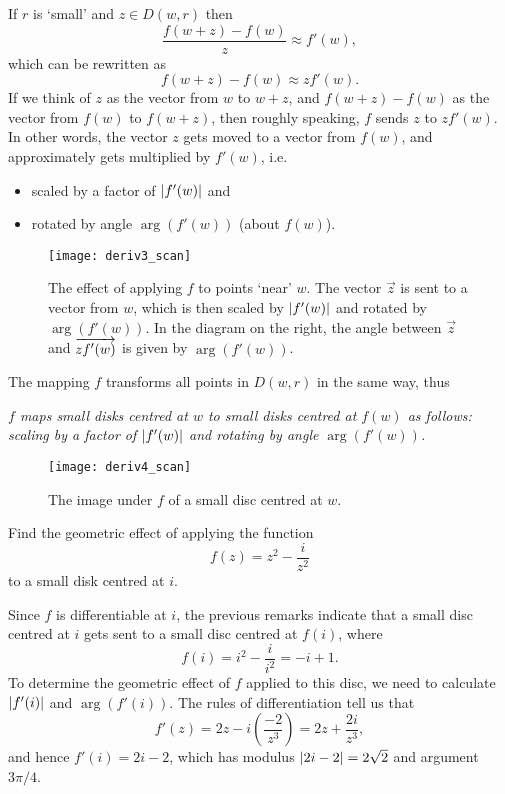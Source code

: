 If $r$ is `small' and $z \in D(w,r)$ then
\[
\frac{f(w+z)-f(w)}{z} \approx f'(w),
\]
which can be rewritten as
\[
f(w+z) - f(w)\approx zf'(w).
\]
If we think of $z$ as the vector from $w$ to $w+z$, and $f(w+z)-f(w)$ as the vector from $f(w)$ to $f(w+z)$, then roughly speaking, $f$  sends $z$ to $zf'(w)$.  In other words, the vector $z$ gets moved to a vector from $f(w)$, and approximately gets multiplied by $f'(w)$, i.e.
\begin{itemize}
\item scaled by a factor of $\left| f'(w) \right|$ and
\item rotated by angle $\arg (f'(w))$ (about $f(w)$).
\end{itemize}
\begin{figure}[h]
\texttt{[image: deriv3\_scan]}
\caption{The effect of applying $f$ to points `near' $w$.  The vector $\vec{z}$ is sent to a vector from $w$, which is then scaled by $\left| f'(w) \right|$ and rotated by $\arg (f'(w))$. In the diagram on the right, the angle between $\vec{z}$ and $\protect\overrightarrow{z f'(w)}$ is given by $\arg (f'(w))$.}
\end{figure}

The mapping $f$ transforms all points in $D(w,r)$ in the same way, thus
\begin{center}
\emph{$f$ maps small disks centred at $w$ to small disks centred at $f(w)$ as follows: scaling by a factor of $\left| f'(w) \right|$ and rotating by angle $\arg (f'(w))$.}
\end{center}

\begin{figure}[h]
\centering
\texttt{[image: deriv4\_scan]}
\caption{The image under $f$ of a small disc centred at $w$.}
\end{figure}

\begin{example}
Find the geometric effect of applying the function
\[
f(z)=z^2-\frac{i}{z^2}
\]
to a small disk centred at $i$.
\end{example}
Since $f$ is differentiable at $i$, the previous remarks indicate that a small disc centred at $i$ gets sent to a small disc centred at $f(i)$, where
\[
f(i) = i^2-\frac{i}{i^2} = -i+1.
\]
To determine the geometric effect of $f$ applied to this disc, we need to calculate $\left| f'(i) \right|$ and $\arg (f'(i))$.  The rules of differentiation tell us that
\[
f'(z) = 2z-i \left( \frac{-2}{z^3} \right) = 2z+ \frac{2i}{z^3},
\]
and hence $f'(i) = 2i-2$, which has modulus $\left| 2i-2 \right|=2\sqrt{2}$ and argument $3\pi/4$.

